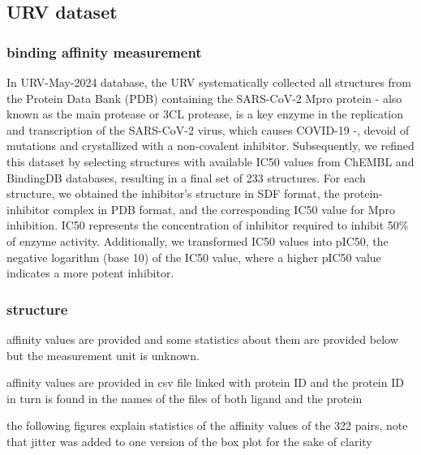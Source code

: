 \documentclass[11pt, a4paper]{article}
\begin{document}
    \subsection{URV dataset}
        \subsubsection{binding affinity measurement}
        In URV-May-2024 database, the URV systematically collected all structures from the Protein Data Bank (PDB) \cite{11} containing the SARS-CoV-2 Mpro protein - also known as the main protease or 3CL protease, is a key enzyme in the replication and transcription of the SARS-CoV-2 virus, which causes COVID-19 -, devoid of mutations and crystallized with a non-covalent inhibitor. 
        Subsequently, we refined this dataset by selecting structures with available IC50 values from ChEMBL \cite{12} and BindingDB \cite{13} databases, resulting in a final set of 233 structures. 
        For each structure, we obtained the inhibitor's structure in SDF format, the protein-inhibitor complex in PDB format, and the corresponding IC50 value for Mpro inhibition.
        IC50 represents the concentration of inhibitor required to inhibit 50\% of enzyme activity. Additionally, we transformed IC50 values into pIC50, the negative logarithm (base 10) of the IC50 value, where a higher pIC50 value indicates a more potent inhibitor.
        \subsubsection{structure}
        affinity values are provided and some statistics about them are provided below but the measurement unit is unknown.

        affinity values are provided in csv file linked with protein ID and the protein ID in turn is found in the names of the files of both ligand and the protein

        the following figures explain statistics of the affinity values of the 322 pairs, note that jitter was added to one version of the box plot for the sake of clarity
        
\end{document}

